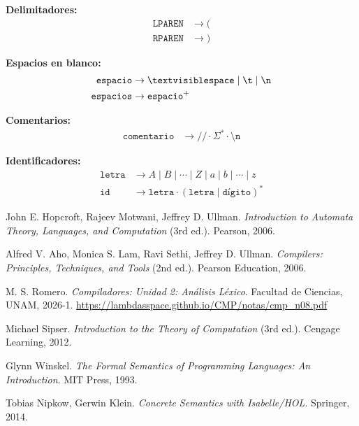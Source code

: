 \documentclass[10pt]{book}
\begin{document}
\textbf{Delimitadores:}
\begin{align*}
\texttt{LPAREN} &\to ( \\
\texttt{RPAREN} &\to )
\end{align*}

\textbf{Espacios en blanco:}
\begin{align*}
\texttt{espacio} &\to \textvisiblespace \mid \texttt{\textbackslash t} \mid \texttt{\textbackslash n} \\
\texttt{espacios} &\to \texttt{espacio}^+
\end{align*}

\textbf{Comentarios:}
\begin{align*}
\texttt{comentario} &\to \texttt{//} \cdot \Sigma^* \cdot \texttt{\textbackslash n}
\end{align*}

\textbf{Identificadores:}
\begin{align*}
\texttt{letra} &\to A \mid B \mid \cdots \mid Z \mid a \mid b \mid \cdots \mid z \\
\texttt{id} &\to \texttt{letra} \cdot (\texttt{letra} \mid \texttt{dígito})^*
\end{align*}

\begin{thebibliography}{9}

John E. Hopcroft, Rajeev Motwani, Jeffrey D. Ullman.
\textit{Introduction to Automata Theory, Languages, and Computation} (3rd ed.).
Pearson, 2006.

Alfred V. Aho, Monica S. Lam, Ravi Sethi, Jeffrey D. Ullman.
\textit{Compilers: Principles, Techniques, and Tools} (2nd ed.).
Pearson Education, 2006.

M. S. Romero.
\textit{Compiladores: Unidad 2: Análisis Léxico}.
Facultad de Ciencias, UNAM, 2026-1.
\url{https://lambdasspace.github.io/CMP/notas/cmp_n08.pdf}

Michael Sipser.
\textit{Introduction to the Theory of Computation} (3rd ed.).
Cengage Learning, 2012.

Glynn Winskel.
\textit{The Formal Semantics of Programming Languages: An Introduction}.
MIT Press, 1993.

Tobias Nipkow, Gerwin Klein.
\textit{Concrete Semantics with Isabelle/HOL}.
Springer, 2014.

\end{thebibliography}
\end{document}
